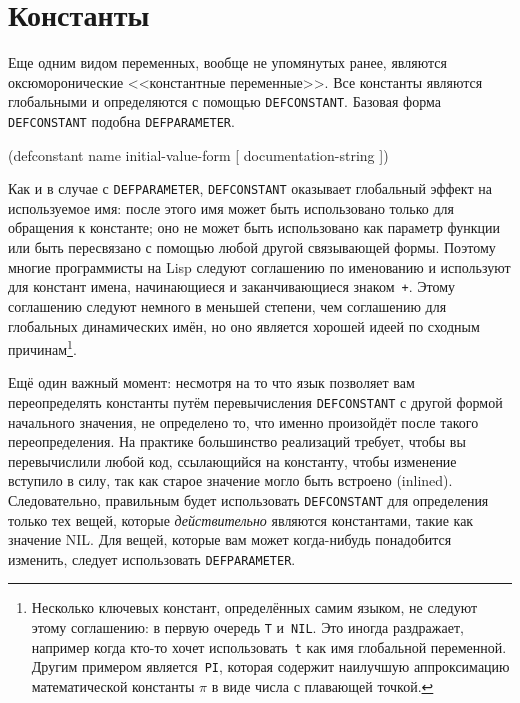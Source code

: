 \section{Константы}

Еще одним видом переменных, вообще не упомянутых ранее, являются оксюморонические
<<константные переменные>>. Все константы являются глобальными и определяются с помощью
\lstinline{DEFCONSTANT}. Базовая форма \lstinline{DEFCONSTANT} подобна \lstinline{DEFPARAMETER}.

\begin{myverb}
(defconstant name initial-value-form [ documentation-string ])
\end{myverb}

Как и в случае с \lstinline{DEFPARAMETER}, \lstinline{DEFCONSTANT} оказывает глобальный
эффект на используемое имя: после этого имя может быть использовано только для обращения к
константе; оно не может быть использовано как параметр функции или быть пересвязано с
помощью любой другой связывающей формы. Поэтому многие программисты на Lisp следуют
соглашению по именованию и используют для констант имена, начинающиеся и заканчивающиеся
знаком~\lstinline{+}. Этому соглашению следуют немного в меньшей степени, чем соглашению для
глобальных динамических имён, но оно является хорошей идеей по сходным
причинам\footnote{Несколько ключевых констант, определённых самим языком, не следуют этому
  соглашению: в первую очередь \lstinline{T} и~\lstinline{NIL}. Это иногда раздражает, например
  когда кто-то хочет использовать~\lstinline{t} как имя глобальной переменной. Другим примером
  является~\lstinline{PI}, которая содержит наилучшую аппроксимацию математической константы
  $\pi$ в виде числа с плавающей точкой.}\hspace{\footnotenegspace}.

Ещё один важный момент: несмотря на то что язык позволяет вам переопределять константы
путём перевычисления \lstinline{DEFCONSTANT} с другой формой начального значения, не
определено то, что именно произойдёт после такого переопределения. На практике
большинство реализаций требует, чтобы вы перевычислили любой код, ссылающийся на
константу, чтобы изменение вступило в силу, так как старое значение могло быть встроено
(inlined). Следовательно, правильным будет использовать \lstinline{DEFCONSTANT} для
определения только тех вещей, которые \textit{действительно} являются константами, такие
как значение NIL. Для вещей, которые вам может когда-нибудь понадобится изменить, следует
использовать \lstinline{DEFPARAMETER}.

